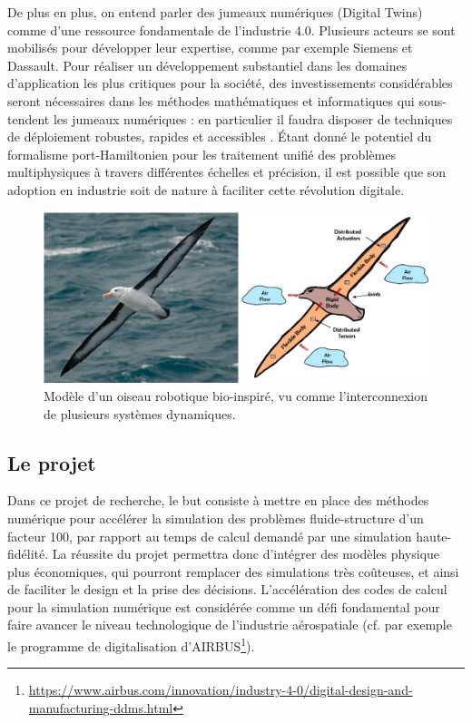 \documentclass[french]{article}
\begin{document}
De plus en plus, on entend parler des jumeaux numériques (Digital Twins) comme d'une ressource fondamentale de l'industrie 4.0. Plusieurs acteurs se sont mobilisés pour développer leur expertise, comme par exemple Siemens et Dassault. Pour réaliser un développement substantiel dans les domaines d'application les plus critiques pour la société, des investissements considérables seront nécessaires dans les méthodes mathématiques et informatiques qui sous-tendent les jumeaux numériques : en particulier il faudra disposer  de techniques de déploiement robustes, rapides et accessibles \cite{niederer2021}. Étant donné le potentiel du formalisme port-Hamiltonien pour les traitement unifié des problèmes multiphysiques \`a travers différentes échelles et précision, il est possible que son adoption en industrie soit de nature \`a faciliter cette révolution digitale. 

\begin{figure}[tb]
	\centering
	\includegraphics[width = \textwidth]{Bird_Port_Hamiltonian_Subsystems_FULL_ARC.eps}
	\caption{Modèle d'un oiseau robotique bio-inspiré, vu comme l'interconnexion de plusieurs systèmes dynamiques. }
	\label{fig:pH_view_bird}
\end{figure}

\subsection{Le projet}
Dans ce projet de recherche, le but consiste \`a mettre en place des méthodes numérique pour accélérer la simulation des problèmes fluide-structure d'un facteur 100, par rapport au temps de calcul demandé par une simulation haute-fidélité.  La réussite du projet permettra donc d'intégrer des modèles physique plus économiques, qui pourront remplacer des simulations très co\^{u}teuses, et ainsi de faciliter le design et la prise des décisions. L'accélération des codes de calcul pour la simulation numérique est considérée comme  un défi fondamental pour faire avancer le niveau technologique de l'industrie aérospatiale (cf. par exemple  le programme de digitalisation d'AIRBUS\footnote{\url{https://www.airbus.com/innovation/industry-4-0/digital-design-and-manufacturing-ddms.html}}).   \\
\end{document}
